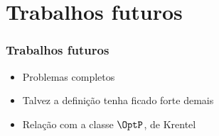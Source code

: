 \documentclass[utf8,notheorems]{beamer}
\theoremstyle{definition}
\begin{document}
\section{Trabalhos futuros}
\begin{frame}
    \frametitle{Trabalhos futuros}
    \begin{itemize}
        \item Problemas completos
        \item Talvez a definição tenha ficado forte demais
        \item Relação com a classe $\OptP$, de Krentel
    \end{itemize}
\end{frame}

\section{} %
\begin{frame}
    \titlepage
\end{frame}
\end{document}
